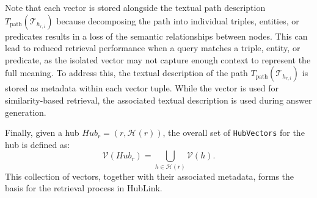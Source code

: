 Note that each vector is stored alongside the textual path description \(T_{\text{path}}(\mathcal{T}_{h_{r,i}})\) because decomposing the path into individual triples, entities, or predicates results in a loss of the semantic relationships between nodes. This can lead to reduced retrieval performance when a query matches a triple, entity, or predicate, as the isolated vector may not capture enough context to represent the full meaning. To address this, the textual description of the path \(T_{\text{path}}(\mathcal{T}_{h_{r,i}})\) is stored as metadata within each vector tuple. While the vector is used for similarity-based retrieval, the associated textual description is used during answer generation.

Finally, given a hub \(Hub_r = (r, \mathcal{H}(r))\), the overall set of \texttt{HubVectors} for the hub is defined as:
\[
\mathcal{V}(Hub_r) = \bigcup_{h \in \mathcal{H}(r)} \mathcal{V}(h).
\]
This collection of vectors, together with their associated metadata, forms the basis for the retrieval process in HubLink.
